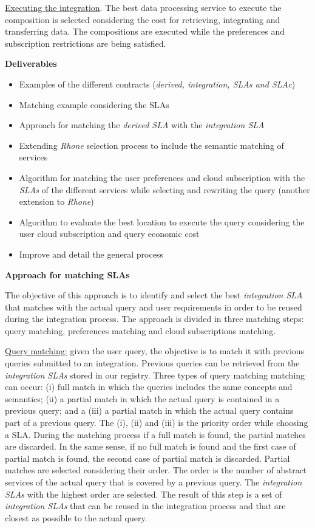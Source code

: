 \documentclass[10pt,a4paper,final]{report}
\begin{document}
\noindent \underline{Executing the integration}. The best data processing service to execute the composition is selected considering the cost for retrieving, integrating and transferring data. The compositions are executed while the preferences and subscription restrictions are being satisfied.
\bigskip

\noindent \textbf{Deliverables}
\begin{itemize}
\item Examples of the different contracts (\textsl{derived, integration, SLAs and SLAc})
\item Matching example considering the SLAs
\item Approach for matching the \textsl{derived SLA} with the \textsl{integration SLA}
\item Extending \textsl{Rhone} selection process to include the semantic matching of services 
\item Algorithm for matching the user preferences and cloud subscription with the \textsl{SLAs} of the different services while selecting and rewriting the query (another extension to \textsl{Rhone})
\item Algorithm to evaluate the best location to execute the query considering the user cloud subscription and query economic cost
\item Improve and detail the general process
\end{itemize}
\bigskip

\noindent \textbf{Approach for matching SLAs}
\bigskip

The objective of this approach is to identify and select the best \textsl{integration SLA} that matches with the actual query and user requirements in order to be reused during the integration process. The approach is divided in three matching steps: query matching, preferences matching and cloud subscriptions matching.
\bigskip

\noindent \underline{Query matching:} given the user query, the objective is to match it with previous queries submitted to an integration. Previous queries can be retrieved from the \textsl{integration SLAs} stored in our registry. Three types of query matching matching can occur: (i) full match in which the queries includes the same concepts and semantics; (ii) a partial match in which the actual query is contained in a previous query; and a (iii) a partial match in which the actual query contains part of a previous query. The (i), (ii) and (iii) is the priority order while choosing a SLA. During the matching process if a full match is found, the partial matches are discarded. In the same sense, if no full match is found and the first case of partial match is found, the second case of partial match is discarded. 
Partial matches are selected considering their order. The order is the number of abstract services of the actual query that is covered by a previous query. The \textsl{integration SLAs} with the highest order are selected.
The result of this step is a set of \textsl{integration SLAs} that can be reused in the integration process and that are closest as possible to the actual query.
\bigskip
\end{document}
